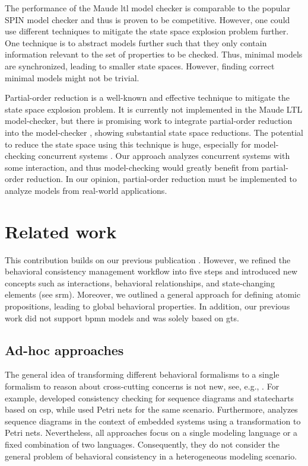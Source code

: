 \documentclass{jot}
\begin{document}
The performance of the Maude \gls*{ltl} model checker is comparable to the popular SPIN model checker \cite{ekerMaudeLTLModel2004} and thus is proven to be competitive.
However, one could use different techniques to mitigate the state space explosion problem further.
One technique is to abstract models further such that they only contain information relevant to the set of properties to be checked.
Thus, minimal models are synchronized, leading to smaller state spaces.
However, finding correct minimal models might not be trivial.

Partial-order reduction is a well-known and effective technique to mitigate the state space explosion problem.
It is currently not implemented in the Maude LTL model-checker, but there is promising work to integrate partial-order reduction into the model-checker \cite{farzanPartialOrderReduction2007}, showing substantial state space reductions.
The potential to reduce the state space using this technique is huge, especially for model-checking concurrent systems \cite{clarkeHandbookModelChecking2018}.
Our approach analyzes concurrent systems with some interaction, and thus model-checking would greatly benefit from partial-order reduction.
In our opinion, partial-order reduction must be implemented to analyze models from real-world applications.


\section{Related work} \label{sec:related_work}
This contribution builds on our previous publication \cite{krauterBehavioralConsistencyHeterogeneous2021}.
However, we refined the behavioral consistency management workflow into five steps and introduced new concepts such as interactions, behavioral relationships, and state-changing elements (see \gls*{srm}).
Moreover, we outlined a general approach for defining atomic propositions, leading to global behavioral properties.
In addition, our previous work did not support \gls*{bpmn} models and was solely based on \gls*{gt}s.

\subsection{Ad-hoc approaches}
The general idea of transforming different behavioral formalisms to a single formalism to reason about cross-cutting concerns is not new, see, e.g., \cite{engelsMethodologySpecifyingAnalyzing2001}.
For example, \cite{kusterExplicitBehavioralConsistency2003} developed consistency checking for sequence diagrams and statecharts based on \gls*{csp}, while \cite{yaoConsistencyCheckingUML2006} used Petri nets for the same scenario.
Furthermore, \cite{cunhaFormalVerificationUML2011} analyzes sequence diagrams in the context of embedded systems using a transformation to Petri nets.
Nevertheless, all approaches focus on a single modeling language or a fixed combination of two languages.
Consequently, they do not consider the general problem of behavioral consistency in a heterogeneous modeling scenario.
\end{document}
